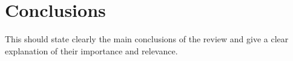 \section{Conclusions}

This should state clearly the main conclusions of the review and give a clear explanation of their importance and relevance.